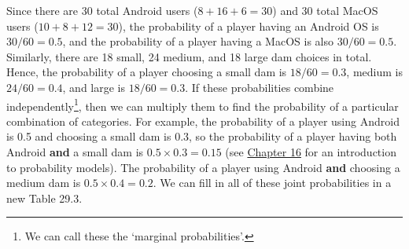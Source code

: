 \documentclass[
  openany]{krantz}
\begin{document}
Since there are 30 total Android users (\(8 + 16 + 6 = 30\)) and 30 total MacOS users (\(10 + 8 + 12 = 30\)), the probability of a player having an Android OS is \(30/60 = 0.5\), and the probability of a player having a MacOS is also \(30 / 60 = 0.5\).
Similarly, there are 18 small, 24 medium, and 18 large dam choices in total.
Hence, the probability of a player choosing a small dam is \(18/60 = 0.3\), medium is \(24/60 = 0.4\), and large is \(18/60 = 0.3\).
If these probabilities combine independently\footnote{We can call these the `marginal probabilities'.}, then we can multiply them to find the probability of a particular combination of categories.
For example, the probability of a player using Android is 0.5 and choosing a small dam is 0.3, so the probability of a player having both Android \textbf{and} a small dam is \(0.5 \times 0.3 = 0.15\) (see \protect\hyperlink{Chapter_16}{Chapter 16} for an introduction to probability models).
The probability of a player using Android \textbf{and} choosing a medium dam is \(0.5 \times 0.4 = 0.2\).
We can fill in all of these joint probabilities in a new Table 29.3.
\end{document}
